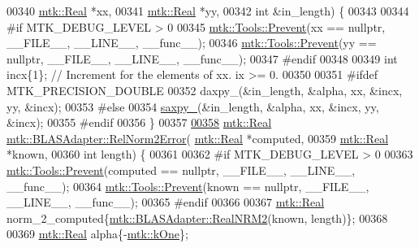 \begin{DoxyCode}
00340                                      \hyperlink{group__c01-roots_gac080bbbf5cbb5502c9f00405f894857d}{mtk::Real} *xx,
00341                                      \hyperlink{group__c01-roots_gac080bbbf5cbb5502c9f00405f894857d}{mtk::Real} *yy,
00342                                      \textcolor{keywordtype}{int} &in\_length) \{
00343 
00344 \textcolor{preprocessor}{  #if MTK\_DEBUG\_LEVEL > 0}
00345   \hyperlink{classmtk_1_1Tools_a332324c6f25e66be9dff48c5987a3b9f}{mtk::Tools::Prevent}(xx == \textcolor{keyword}{nullptr}, \_\_FILE\_\_, \_\_LINE\_\_, \_\_func\_\_);
00346   \hyperlink{classmtk_1_1Tools_a332324c6f25e66be9dff48c5987a3b9f}{mtk::Tools::Prevent}(yy == \textcolor{keyword}{nullptr}, \_\_FILE\_\_, \_\_LINE\_\_, \_\_func\_\_);
00347 \textcolor{preprocessor}{  #endif}
00348 
00349   \textcolor{keywordtype}{int} incx\{1\};  \textcolor{comment}{// Increment for the elements of xx. ix >= 0.}
00350 
00351 \textcolor{preprocessor}{  #ifdef MTK\_PRECISION\_DOUBLE}
00352   daxpy\_(&in\_length, &alpha, xx, &incx, yy, &incx);
00353 \textcolor{preprocessor}{  #else}
00354   \hyperlink{namespacemtk_a81a2d7d1ea9eff65ae13646c93dad5e9}{saxpy\_}(&in\_length, &alpha, xx, &incx, yy, &incx);
00355 \textcolor{preprocessor}{  #endif}
00356 \}
00357 
\hypertarget{mtk__blas__adapter_8cc_source_l00358}{}\hyperlink{classmtk_1_1BLASAdapter_af2ac5691f45e67d6e26186b071119ec4}{00358} \hyperlink{group__c01-roots_gac080bbbf5cbb5502c9f00405f894857d}{mtk::Real} \hyperlink{classmtk_1_1BLASAdapter_af2ac5691f45e67d6e26186b071119ec4}{mtk::BLASAdapter::RelNorm2Error}(
      \hyperlink{group__c01-roots_gac080bbbf5cbb5502c9f00405f894857d}{mtk::Real} *computed,
00359                                           \hyperlink{group__c01-roots_gac080bbbf5cbb5502c9f00405f894857d}{mtk::Real} *known,
00360                                           \textcolor{keywordtype}{int} length) \{
00361 
00362 \textcolor{preprocessor}{  #if MTK\_DEBUG\_LEVEL > 0}
00363   \hyperlink{classmtk_1_1Tools_a332324c6f25e66be9dff48c5987a3b9f}{mtk::Tools::Prevent}(computed == \textcolor{keyword}{nullptr}, \_\_FILE\_\_, \_\_LINE\_\_, \_\_func\_\_);
00364   \hyperlink{classmtk_1_1Tools_a332324c6f25e66be9dff48c5987a3b9f}{mtk::Tools::Prevent}(known == \textcolor{keyword}{nullptr}, \_\_FILE\_\_, \_\_LINE\_\_, \_\_func\_\_);
00365 \textcolor{preprocessor}{  #endif}
00366 
00367   \hyperlink{group__c01-roots_gac080bbbf5cbb5502c9f00405f894857d}{mtk::Real} norm\_2\_computed\{\hyperlink{classmtk_1_1BLASAdapter_ab92440888b730863244c5d9479c11aca}{mtk::BLASAdapter::RealNRM2}(known, length)\};
00368 
00369   \hyperlink{group__c01-roots_gac080bbbf5cbb5502c9f00405f894857d}{mtk::Real} alpha\{-\hyperlink{group__c01-roots_ga26407c24d43b6b95480943340d285c71}{mtk::kOne}\};

\end{DoxyCode}
